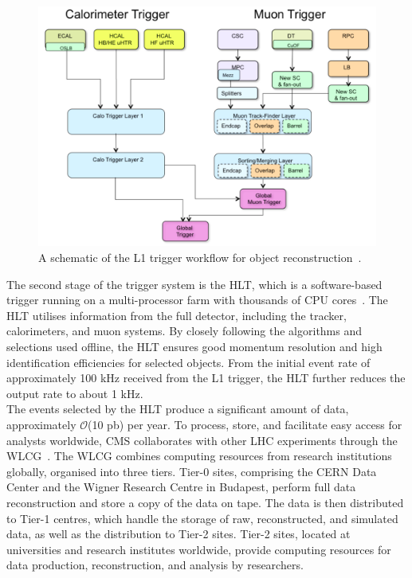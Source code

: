 \begin{figure}[!hbtp]
    \centering
    \includegraphics[width=\textwidth]{Figures/trigger.png}
    \caption[Diagram of the CMS L1 trigger workflow.]{A schematic of the L1 trigger workflow for object reconstruction~\cite{Tapper:2013yva}.}
    \label{fig:trigger}
\end{figure}

The second stage of the trigger system is the \ac{HLT}, which is a software-based trigger running on a multi-processor farm with thousands of CPU cores~\cite{CMS_trigger,CMSTrigger:2005yhe}. 
The \ac{HLT} utilises information from the full detector, including the tracker, calorimeters, and muon systems. 
By closely following the algorithms and selections used offline, the \ac{HLT} ensures good momentum resolution and high identification efficiencies for selected objects. 
From the initial event rate of approximately 100 kHz received from the \ac{L1} trigger, the \ac{HLT} further reduces the output rate to about 1 kHz. \\

The events selected by the \ac{HLT} produce a significant amount of data, approximately $\mathcal{O}$(10 pb) per year. 
To process, store, and facilitate easy access for analysts worldwide, \ac{CMS} collaborates with other \ac{LHC} experiments through the \ac{WLCG}~\cite{wlcg}. 
The \ac{WLCG} combines computing resources from research institutions globally, organised into three tiers. 
Tier-0 sites, comprising the \ac{CERN} Data Center and the Wigner Research Centre in Budapest, perform full data reconstruction and store a copy of the data on tape. 
The data is then distributed to Tier-1 centres, which handle the storage of raw, reconstructed, and simulated data, as well as the distribution to Tier-2 sites. 
Tier-2 sites, located at universities and research institutes worldwide, provide computing resources for data production, reconstruction, and analysis by researchers.
